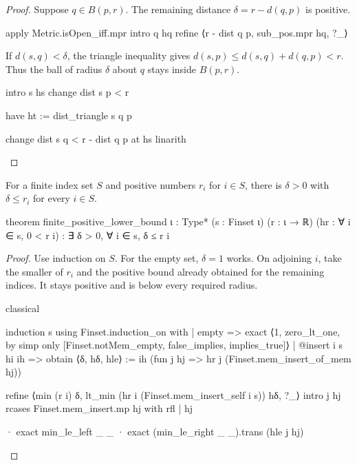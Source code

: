 \begin{proof}
  Suppose $q\in B(p,r)$.
  The remaining distance $\delta=r-d(q,p)$ is positive.

  \begin{lean}
    apply Metric.isOpen_iff.mpr
    intro q hq
    refine ⟨r - dist q p, sub_pos.mpr hq, ?_⟩
  \end{lean}

  If $d(s,q)<\delta$, the triangle inequality gives $d(s,p)\leq d(s,q)+d(q,p)<r$.
  Thus the ball of radius $\delta$ about $q$ stays inside $B(p,r)$.

  \begin{lean}
    intro s hs
    change dist s p < r

    have ht := dist_triangle s q p

    change dist s q < r - dist q p at hs
    linarith
  \end{lean}

\end{proof}

\begin{lemma}
  \label{an1:lem:finite-positive-lower-bound}
  For a finite index set $S$ and positive numbers $r_i$ for $i\in S$, there is $\delta>0$ with
  $\delta\leq r_i$ for every $i\in S$.

  \begin{lean}
    theorem finite_positive_lower_bound {ι : Type*} (s : Finset ι)
        (r : ι → ℝ) (hr : ∀ i ∈ s, 0 < r i) :
        ∃ δ > 0, ∀ i ∈ s, δ ≤ r i
  \end{lean}
\end{lemma}

\begin{proof}
  Use induction on $S$.
  For the empty set, $\delta=1$ works.
  On adjoining $i$, take the smaller of $r_i$ and the positive bound already obtained for the
  remaining indices.
  It stays positive and is below every required radius.

  \begin{lean}
    classical

    induction s using Finset.induction_on with
    | empty => exact ⟨1, zero_lt_one, by simp only [Finset.notMem_empty, false_implies, implies_true]⟩
    | @insert i s hi ih =>
      obtain ⟨δ, hδ, hle⟩ := ih (fun j hj => hr j (Finset.mem_insert_of_mem hj))

      refine ⟨min (r i) δ, lt_min (hr i (Finset.mem_insert_self i s)) hδ, ?_⟩
      intro j hj
      rcases Finset.mem_insert.mp hj with rfl | hj

      · exact min_le_left _ _
      · exact (min_le_right _ _).trans (hle j hj)
  \end{lean}

\end{proof}

